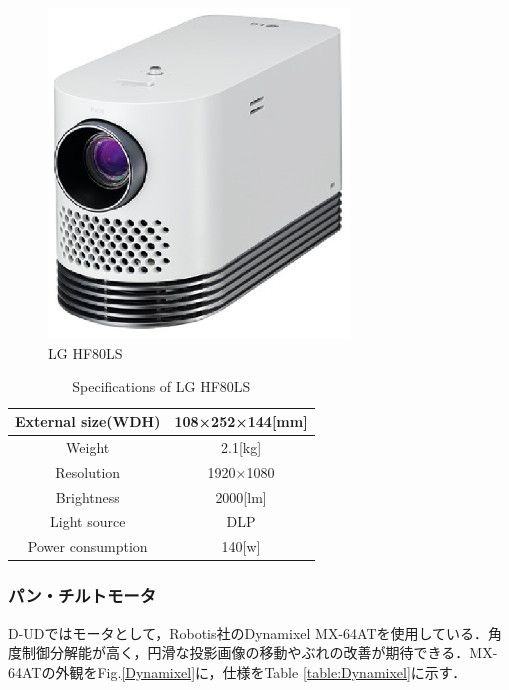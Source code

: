 \documentclass[12pt]{sonota/aislab}
\begin{document}
\begin{figure}[h]
\begin{center}
\includegraphics[clip, width=8cm]{figs/lg_projector.eps}
\caption{LG HF80LS}
\label{LG}
\end{center}
\end{figure}

\begin{table}[h]
	\caption{Specifications of LG HF80LS}
	\label{table:LG}
	\centering 
	\begin{tabular}[tbp]{|c|c|}
		\hline 
		External size(WDH) & 108×252×144[mm] \\\hline
		Weight & 2.1[kg] \\\hline
		Resolution & 1920×1080 \\\hline
		Brightness & 2000[lm] \\\hline
		Light source & DLP \\\hline
		Power consumption & 140[w] \\\hline
	\end{tabular}
\end{table}

\subsubsection{パン・チルトモータ}
D-UDではモータとして，Robotis社のDynamixel MX-64ATを使用している．角度制御分解能が高く，円滑な投影画像の移動やぶれの改善が期待できる．MX-64ATの外観をFig.\ref{Dynamixel}に，仕様をTable \ref{table:Dynamixel}に示す．
\end{document}
